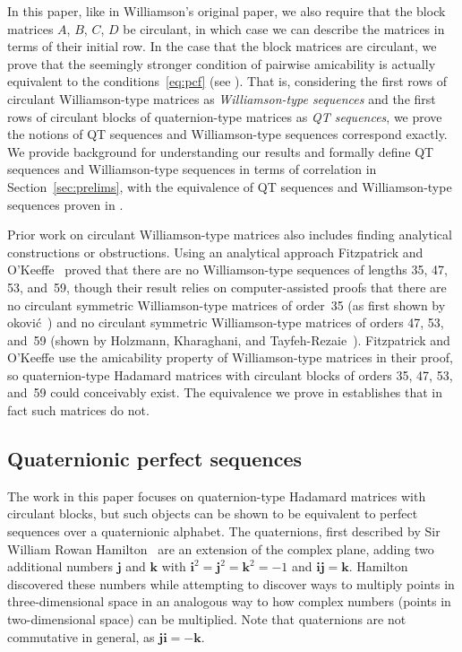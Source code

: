 \documentclass[12pt]{article}
\numberwithin{equation}{section}
\newcommand{\qi}{\mathbf{i}}
\newcommand{\qj}{\mathbf{j}}
\newcommand{\qk}{\mathbf{k}}
\begin{document}
In this paper, like in Williamson's original paper, we also require that the block matrices
$A$, $B$, $C$, $D$ be circulant, in which case we can describe the matrices in terms of their initial row.
In the case that the block matrices are circulant, we prove that
the seemingly stronger condition of pairwise amicability is actually
equivalent to the conditions~\eqref{eq:pcf} (see ).
That is, considering the first rows of circulant
Williamson-type matrices as \emph{Williamson-type sequences} and the first rows
of circulant blocks of quaternion-type matrices as \emph{QT sequences},
we prove the notions of QT sequences and Williamson-type sequences
correspond exactly.
We provide background for understanding our results and formally define QT sequences and Williamson-type sequences
in terms of correlation in Section~\ref{sec:prelims}, with
the equivalence of QT sequences and Williamson-type sequences proven in
.

Prior work on circulant Williamson-type matrices also includes finding analytical constructions or obstructions. Using an analytical approach
Fitzpatrick and O'Keeffe~\cite{Fitzpatrick2023} proved that there are no Williamson-type sequences of lengths 35, 47, 53, and~59,
though their result relies on computer-assisted proofs
that there are no circulant symmetric Williamson-type matrices of order~35
(as first shown by \DJ okovi\'c~\cite{Dokovi1993}) and no circulant symmetric Williamson-type matrices of orders 47, 53, and~59
(shown by Holzmann, Kharaghani, and Tayfeh-Rezaie~\cite{Holzmann2008}).
Fitzpatrick and O'Keeffe use the amicability property of
Williamson-type matrices in their proof, so
quaternion-type Hadamard matrices with circulant blocks of orders 35, 47, 53, and~59
could conceivably exist.  The equivalence we prove in  establishes that in fact such matrices do not.

\subsection{Quaternionic perfect sequences}

The work in this paper focuses on quaternion-type Hadamard matrices with circulant blocks, but such objects
can be shown to be equivalent to perfect sequences over a quaternionic alphabet.
The quaternions, first described by Sir William Rowan Hamilton~\cite{Hamilton1844} are an extension of the complex plane, adding two additional numbers $\qj$ and $\qk$ with $\qi^2 = \qj^2 =\qk^2 = -1$ and $\qi\qj = \qk$.
Hamilton discovered these numbers while attempting to discover ways to multiply points in three-dimensional space
in an analogous way to how complex numbers (points in two-dimensional space) can be multiplied.
Note that quaternions are not commutative in general, as $\qj\qi = -\qk$.
\end{document}
